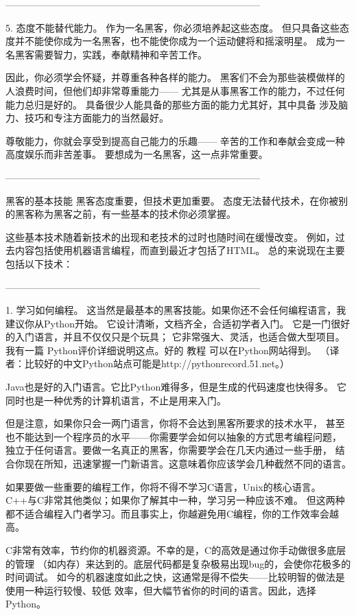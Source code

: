 \documentclass[a4paper,12pt,UTF8,twoside]{ctexbook}
\begin{document}
--------------------------------------------------------------------------------

5. 态度不能替代能力。
作为一名黑客，你必须培养起这些态度。 但只具备这些态度并不能使你成为一名黑客，也不能使你成为一个运动健将和摇滚明星。 成为一名黑客需要智力，实践，奉献精神和辛苦工作。

因此，你必须学会怀疑，并尊重各种各样的能力。 黑客们不会为那些装模做样的人浪费时间，但他们却非常尊重能力—— 尤其是从事黑客工作的能力，不过任何能力总归是好的。 具备很少人能具备的那些方面的能力尤其好，其中具备 涉及脑力、技巧和专注方面能力的当然最好。

尊敬能力，你就会享受到提高自己能力的乐趣—— 辛苦的工作和奉献会变成一种高度娱乐而非苦差事。 要想成为一名黑客，这一点非常重要。


--------------------------------------------------------------------------------

黑客的基本技能
黑客态度重要，但技术更加重要。 态度无法替代技术，在你被别的黑客称为黑客之前，有一些基本的技术你必须掌握。

这些基本技术随着新技术的出现和老技术的过时也随时间在缓慢改变。 例如，过去内容包括使用机器语言编程，而直到最近才包括了HTML。 总的来说现在主要包括以下技术：


--------------------------------------------------------------------------------

1. 学习如何编程。
这当然是最基本的黑客技能。如果你还不会任何编程语言，我建议你从Python开始。 它设计清晰，文档齐全，合适初学者入门。 它是一门很好的入门语言，并且不仅仅只是个玩具； 它非常强大、灵活，也适合做大型项目。 我有一篇 Python评价详细说明这点。好的 教程 可以在Python网站得到。 （译者：比较好的中文Python站点可能是http://pythonrecord.51.net。）

Java也是好的入门语言。它比Python难得多，但是生成的代码速度也快得多。 它同时也是一种优秀的计算机语言，不止是用来入门。

但是注意，如果你只会一两门语言，你将不会达到黑客所要求的技术水平， 甚至也不能达到一个程序员的水平——你需要学会如何以抽象的方式思考编程问题， 独立于任何语言。要做一名真正的黑客，你需要学会在几天内通过一些手册， 结合你现在所知，迅速掌握一门新语言。这意味着你应该学会几种截然不同的语言。

如果要做一些重要的编程工作，你将不得不学习C语言，Unix的核心语言。 C++与C非常其他类似；如果你了解其中一种，学习另一种应该不难。 但这两种都不适合编程入门者学习。而且事实上，你越避免用C编程，你的工作效率会越高。

C非常有效率，节约你的机器资源。不幸的是，C的高效是通过你手动做很多底层的管理 （如内存）来达到的。底层代码都是复杂极易出现bug的，会使你花极多的时间调试。 如今的机器速度如此之快，这通常是得不偿失——比较明智的做法是使用一种运行较慢、较低 效率，但大幅节省你的时间的语言。因此，选择Python。
\end{document}
